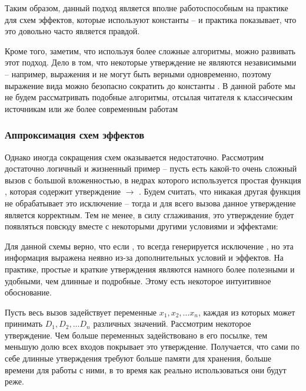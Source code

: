 Таким образом, данный подход является вполне работоспособным на практике для схем эффектов, которые используют константы -- и практика показывает, что это довольно часто является правдой.

Кроме того, заметим, что используя более сложные алгоритмы, можно развивать этот подход. Дело в том, что некоторые утверждение не являются независимыми -- например, выражения  и  не могут быть верными одновременно, поэтому выражение вида  можно безопасно сократить до константы . В данной работе мы не будем рассматривать подобные алгоритмы, отсылая читателя к классическим источникам \cite{McCluskey56} или же более современным работам \cite{Jain08}


\subsubsection{Аппроксимация схем эффектов}

Однако иногда сокращения схем оказывается недостаточно. Рассмотрим достаточно логичный и жизненный пример -- пусть есть какой-то очень сложный вызов с большой вложенностью, в недрах которого используется простая функция , которая содержит утверждение  $\rightarrow$ . Будем считать, что никакая другая функция не обрабатывает это исключение -- тогда и для всего вызова данное утверждение является корректным. Тем не менее, в силу сглаживания, это утверждение будет появляться повсюду вместе с некоторыми другими условиями и эффектами:

{}

Для данной схемы верно, что если , то всегда генерируется исключение , но эта информация выражена неявно из-за дополнительных условий и эффектов. На практике, простые и краткие утверждения являются намного более полезными и удобными, чем длинные и подробные. Этому есть некоторое интуитивное обоснование. 

Пусть весь вызов задействует переменные $x_1, x_2, \ldots x_n$, каждая из которых может принимать $D_1, D_2, \ldots D_n$ различных значений. Рассмотрим некоторое утверждение. Чем больше переменных задействовано в его посылке, тем меньшую долю всех входов покрывает это утверждение. Получается, что сами по себе длинные утверждения требуют больше памяти для хранения, больше времени для работы с ними, в то время как реально использоваться они будут реже. 

